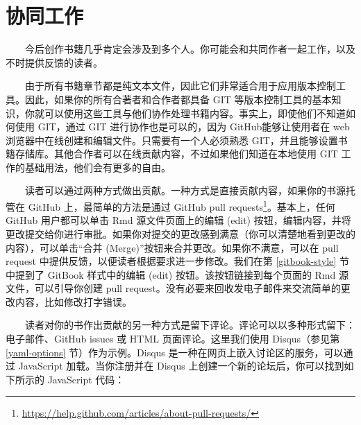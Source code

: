 \documentclass[
  12pt,
]{krantz}
\renewcommand{\href}[2]{#2\footnote{\url{#1}}}
\theoremstyle{definition}
\theoremstyle{definition}
\theoremstyle{definition}
\theoremstyle{definition}
\theoremstyle{remark}
\begin{document}
\hypertarget{collaboration}{%
\section{协同工作}\label{collaboration}}

  今后创作书籍几乎肯定会涉及到多个人。你可能会和共同作者一起工作，以及不时提供反馈的读者。

  由于所有书籍章节都是纯文本文件，因此它们非常适合用于应用版本控制工具。因此，如果你的所有合著者和合作者都具备 GIT 等版本控制工具的基本知识，你就可以使用这些工具与他们协作处理书籍内容。事实上，即使他们不知道如何使用 GIT，通过 GIT 进行协作也是可以的，因为 GitHub能够让使用者在 web 浏览器中在线创建和编辑文件。只需要有一个人必须熟悉 GIT，并且能够设置书籍存储库。其他合作者可以在线贡献内容，不过如果他们知道在本地使用 GIT 工作的基础用法，他们会有更多的自由。

  读者可以通过两种方式做出贡献。一种方式是直接贡献内容，如果你的书源托管在 GitHub 上，最简单的方法是通过 \href{https://help.github.com/articles/about-pull-requests/}{GitHub pull requests}。基本上，任何 GitHub 用户都可以单击 Rmd 源文件页面上的编辑 (edit) 按钮，编辑内容，并将更改提交给你进行审批。如果你对提交的更改感到满意（你可以清楚地看到更改的内容），可以单击``合并 (Merge)''按钮来合并更改。如果你不满意，可以在 pull request 中提供反馈，以便读者根据要求进一步修改。我们在第 \ref{gitbook-style} 节中提到了 GitBook 样式中的编辑 (edit) 按钮。该按钮链接到每个页面的 Rmd 源文件，可以引导你创建 pull request。没有必要来回收发电子邮件来交流简单的更改内容，比如修改打字错误。

  读者对你的书作出贡献的另一种方式是留下评论。评论可以以多种形式留下：电子邮件、GitHub issues 或 HTML 页面评论。这里我们使用 Disqus（参见第 \ref{yaml-options} 节）作为示例。Disqus 是一种在网页上嵌入讨论区的服务，可以通过 JavaScript 加载。当你注册并在 Disqus 上创建一个新的论坛后，你可以找到如下所示的 JavaScript 代码：
\end{document}
